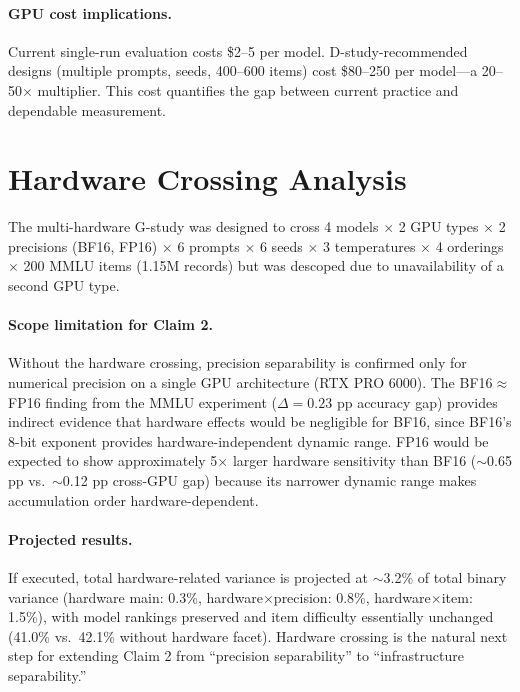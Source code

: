 \documentclass[11pt]{article}
\begin{document}
\paragraph{GPU cost implications.}
Current single-run evaluation costs \$2--5 per model.
D-study-recommended designs (multiple prompts, seeds, 400--600 items) cost \$80--250 per model---a 20--50$\times$ multiplier.
This cost quantifies the gap between current practice and dependable measurement.

\section{Hardware Crossing Analysis}
\label{sec:hardware}

The multi-hardware G-study was designed to cross 4 models $\times$ 2 GPU types $\times$ 2 precisions (BF16, FP16) $\times$ 6 prompts $\times$ 6 seeds $\times$ 3 temperatures $\times$ 4 orderings $\times$ 200 MMLU items (1.15M records) but was descoped due to unavailability of a second GPU type.

\paragraph{Scope limitation for Claim 2.}
Without the hardware crossing, precision separability is confirmed only for numerical precision on a single GPU architecture (RTX PRO 6000).
The BF16$\approx$FP16 finding from the MMLU experiment ($\Delta = 0.23$ pp accuracy gap) provides indirect evidence that hardware effects would be negligible for BF16, since BF16's 8-bit exponent provides hardware-independent dynamic range.
FP16 would be expected to show approximately 5$\times$ larger hardware sensitivity than BF16 ($\sim$0.65 pp vs.\ $\sim$0.12 pp cross-GPU gap) because its narrower dynamic range makes accumulation order hardware-dependent.

\paragraph{Projected results.}
If executed, total hardware-related variance is projected at $\sim$3.2\% of total binary variance (hardware main: 0.3\%, hardware$\times$precision: 0.8\%, hardware$\times$item: 1.5\%), with model rankings preserved and item difficulty essentially unchanged (41.0\% vs.\ 42.1\% without hardware facet).
Hardware crossing is the natural next step for extending Claim 2 from ``precision separability'' to ``infrastructure separability.''
\end{document}

